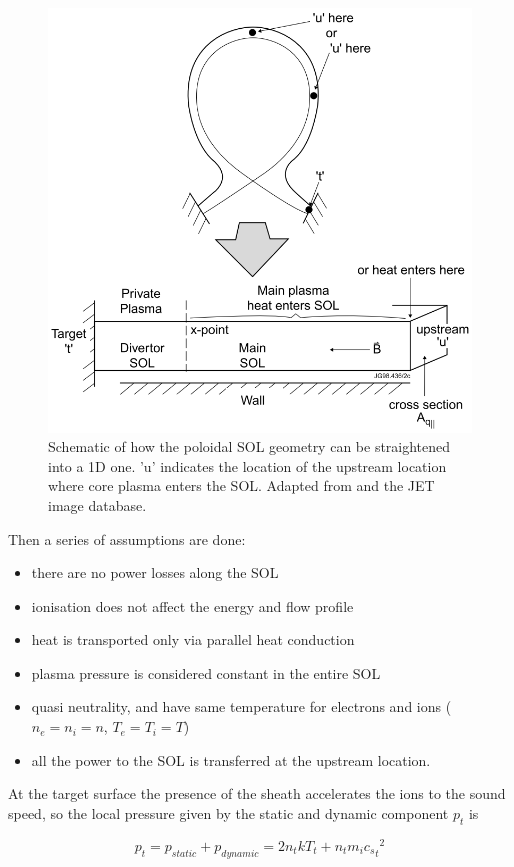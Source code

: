 \begin{figure}[!ht]
	\centering
	\includegraphics[trim={0 0 0 0},clip,width=0.65\linewidth]{Chapters/chapter1/figs/2PM.png}
	\caption{Schematic of how the poloidal SOL geometry can be straightened into a 1D one. 'u' indicates the location of the upstream location where core plasma enters the SOL.%
    Adapted from \cite{Harrison2011} and the JET image database.}
	\label{fig:2PM}
\end{figure}

Then a series of assumptions are done:
\begin{itemize}
    \item there are no power losses along the SOL%
    \item ionisation does not affect the energy and flow profile
    \item heat is transported only via parallel heat conduction
    \item plasma pressure is considered constant in the entire SOL
    \item quasi neutrality, and have same temperature for electrons and ions ($n_e = n_i = n$, $T_e = T_i = T$)
    \item all the power to the SOL is transferred at the upstream location.
\end{itemize}

At the target surface the presence of the sheath accelerates the ions to the sound speed, so the local pressure given by the static and dynamic component $p_t$ is

\begin{equation}
p_{t} = p_{static} + p_{dynamic} = 2n_{t} k T_{t} + n_{t} m_i {{c_s}_t}^2
\label{eq:2pm1}
\end{equation}


